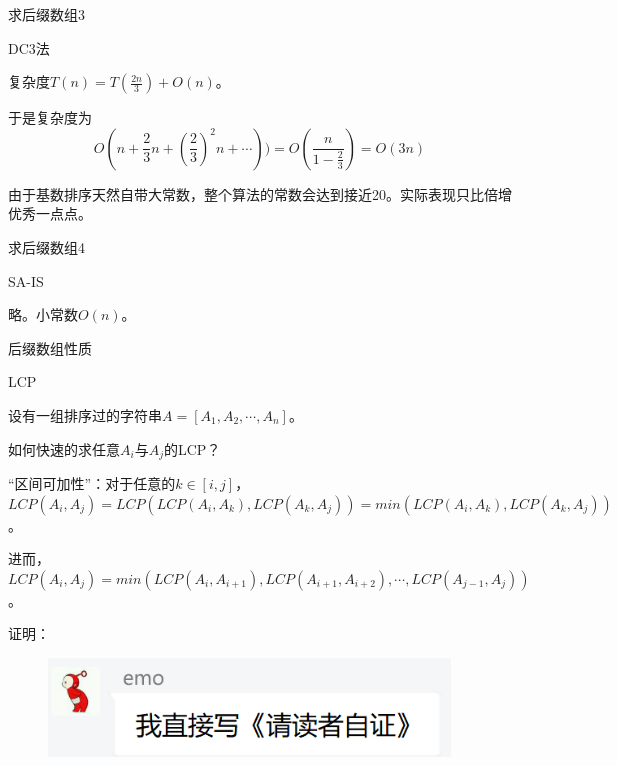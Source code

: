 \documentclass[usenames,dvipsnames]{ctexbeamer}		%
\begin{document}
\begin{frame}{求后缀数组3}

\begin{block}{DC3法}

复杂度$T(n) = T(\frac{2n}{3}) + O(n)$。

于是复杂度为$$O(n + \frac{2}{3}n + (\frac{2}{3})^2n + \cdots)) 
= O(\frac{n}{1-\frac{2}{3}}) 
= O(3n)$$

由于基数排序天然自带大常数，整个算法的常数会达到接近20。实际表现只比倍增优秀一点点。
\end{block}
\end{frame}

\begin{frame}{求后缀数组4}
    
\begin{block}{SA-IS}

略。小常数$O(n)$。

\end{block}
\end{frame}

\begin{frame}{后缀数组性质}

\begin{block}{LCP}

设有一组排序过的字符串$A = [A_1, A_2, \cdots, A_n]$。

如何快速的求任意$A_i$与$A_j$的LCP？

\pause

\vbox{}
“区间可加性”：对于任意的$k\in [i,j]$，$LCP(A_i, A_j) = LCP(LCP(A_i,A_k), LCP(A_k,A_j)) = min(LCP(A_i, A_k), LCP(A_k, A_j))$。

\pause
进而，$LCP(A_i, A_j) = min(LCP(A_i, A_{i+1}), LCP(A_{i+1}, A_{i+2}),\cdots, LCP(A_{j-1}, A_{j}))$。

证明：
\pause
\begin{figure}
    \centering
    \includegraphics[width=0.95\textwidth]{./emo.png}
\end{figure}

\end{block}
\end{frame}
\end{document}
